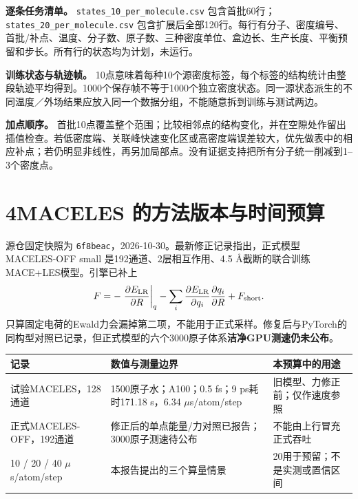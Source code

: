 \documentclass[a4paper]{ctexart}
\newcommand{\planned}{\textcolor{red!65!black}{计划，未运行}}
\begin{document}
\textbf{逐条任务清单。} \texttt{states\_10\_per\_molecule.csv} 包含首批60行；\texttt{states\_20\_per\_molecule.csv} 包含扩展后全部120行。每行有分子、密度编号、首批/补点、温度、分子数、原子数、三种密度单位、盒边长、生产长度、平衡预留和步长。所有行的状态均为\planned。

\textbf{训练状态与轨迹帧。} 10点意味着每种10个源密度标签，每个标签的结构统计由整段轨迹平均得到。1000个保存帧不等于1000个独立密度状态。同一源状态派生的不同温度／外场结果应放入同一个数据分组，不能随意拆到训练与测试两边。

\textbf{加点顺序。} 首批10点覆盖整个范围；比较相邻点的结构变化，并在空隙处作留出插值检查。若低密度端、关联峰快速变化区或高密度端误差较大，优先做表中的相应补点；若仍明显非线性，再另加局部点。没有证据支持把所有分子统一削减到1--3个密度点。

\clearpage
\section*{4\quad MACELES 的方法版本与时间预算}
源仓固定快照为 \texttt{6f8beac}，2026-10-30。最新修正记录指出，正式模型 MACELES-OFF small 是192通道、2层相互作用、4.5 \AA{}截断的联合训练MACE+LES模型。引擎已补上
\[
F=-\left.\frac{\partial E_{\rm LR}}{\partial R}\right|_q
  -\sum_i\frac{\partial E_{\rm LR}}{\partial q_i}\frac{\partial q_i}{\partial R}
  +F_{\rm short}.
\]
只算固定电荷的Ewald力会漏掉第二项，不能用于正式采样。修复后与PyTorch的同构型对照已记录，但正式模型的六个3000原子体系\textbf{洁净GPU测速仍未公布}。

\begin{center}\small\begin{tabularx}{\textwidth}{lXX}\toprule
记录 & 数值与测量边界 & 本预算中的用途\\\midrule
试验MACELES，128通道 & 1500原子水；A100；0.5 fs；9 ps耗时171.18 s，6.34 $\mu$s/atom/step & 旧模型、力修正前；仅作速度参照\\
正式MACELES-OFF，192通道 & 修正后的单点能量/力对照已报告；3000原子测速待公布 & 不能由上行冒充正式吞吐\\
10 / 20 / 40 $\mu$s/atom/step & 本报告提出的三个算量情景 & 20用于预留；不是实测或置信区间\\\bottomrule
\end{tabularx}\end{center}
\end{document}
